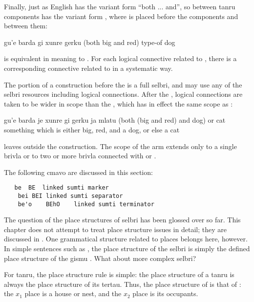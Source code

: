 Finally, just as English  has the variant form ``both
    ... and'', so  between tanru components has the variant
    form , where  is placed before the
    components and  between them:
\begin{example}
gu'e barda gi xunre gerku\n
(both big and red) type-of dog
\end{example}

{\noindent}is equivalent in meaning to .
    For each logical connective related to , there is a
    corresponding connective related to  in a
    systematic way. 

The portion of a  construction before the
     is a full selbri, and may use any of the selbri
    resources including  logical connections. After the
    , logical connections are taken to be wider in scope than
    the , which has in effect the same scope as
    :
\begin{example}
gu'e barda je xunre gi gerku ja mlatu\n
(both (big and red) and dog) or cat\n
something which is either big, red, and a dog,\n
\T	or else a cat
\end{example}

{\noindent}leaves  outside the  construction. The
    scope of the  arm extends only to a single brivla or to
    two or more brivla connected with  or .




The following cmavo are discussed in this section:
\begin{verbatim}
   be  BE  linked sumti marker
    bei BEI linked sumti separator
    be'o    BEhO    linked sumti terminator
\end{verbatim}

The question of the place structures of selbri has been
    glossed over so far. This chapter does not attempt to treat
    place structure issues in detail; they are discussed in . One grammatical structure
    related to places belongs here, however. In simple sentences
    such as , the place structure of
    the selbri is simply the defined place structure of the gismu
    . What about more complex selbri?

For tanru, the place structure rule is simple: the place
    structure of a tanru is always the place structure of its
    tertau. Thus, the place structure of  is that of
    : the $x_1$ place is a house or nest, and the $x_2$ place is
    its occupants.

